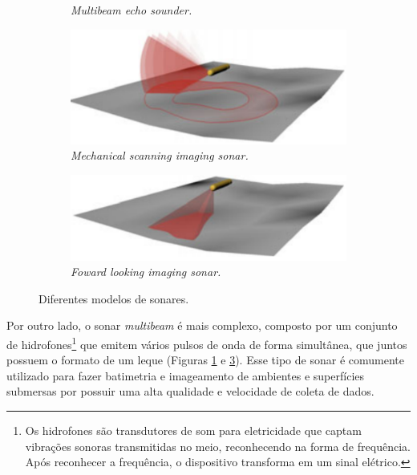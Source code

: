 \begin{figure}[H]
\begin{subfigure}[t]{0.4\textwidth}
        \caption{\textit{Multibeam echo sounder.}}
        \label{fig:multi-prof-sonar}
    \end{subfigure}
    \begin{subfigure}[t]{0.4\textwidth}
        \includegraphics[width=\textwidth]{dados/figuras/msis.png}
        \caption{\textit{Mechanical scanning imaging sonar.}}
        \label{fig:msis}
    \end{subfigure}
    \begin{subfigure}[t]{0.4\textwidth}
        \includegraphics[width=\textwidth]{dados/figuras/fls.png}
        \caption{\textit{Foward looking imaging sonar.}}
        \label{fig:fls}
    \end{subfigure}
    \caption{Diferentes modelos de sonares.}
    \vspace{-0.8em}
    \label{fig:beams}
\end{figure}

Por outro lado, o sonar \textit{multibeam} é mais complexo, composto por um conjunto de hidrofones\footnote{Os hidrofones são transdutores de som para eletricidade que captam vibrações sonoras transmitidas no meio, reconhecendo na forma de frequência. Após reconhecer a frequência, o dispositivo transforma em um sinal elétrico.} que emitem vários pulsos de onda de forma simultânea, que juntos possuem o formato de um leque (Figuras \ref{fig:multi-prof-sonar} e \ref{fig:fls}). Esse tipo de sonar é comumente utilizado para fazer batimetria e imageamento de ambientes e superfícies submersas por possuir uma alta qualidade e velocidade de coleta de dados.

